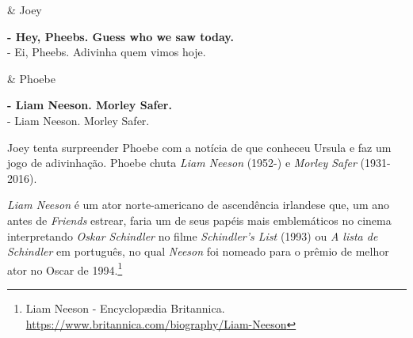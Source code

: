 \begin{tcolorbox}[enhanced,center upper,
    drop fuzzy shadow southeast, boxrule=0.3pt,
    lower separated=false, breakable,
    colframe=black!30!dialogoBorder,colback=white]
\begin{minipage}[c]{0.16\linewidth}
   & \centering \scriptsize{Joey}
\end{minipage}
\hfill
\begin{minipage}[c]{0.8\linewidth}
  \textbf{- Hey, Pheebs. Guess who we saw today.}\\
  - Ei, Pheebs. Adivinha quem vimos hoje.
\end{minipage}

\medskip
\begin{minipage}[c]{0.16\linewidth}
   & \centering \scriptsize{Phoebe}
\end{minipage}
\hfill
\begin{minipage}[c]{0.8\linewidth}
  \textbf{- Liam Neeson. Morley Safer.}\\
  - Liam Neeson. Morley Safer.
\end{minipage}
\end{tcolorbox}

Joey tenta surpreender Phoebe com a notícia de que conheceu Ursula e faz
um jogo de adivinhação. Phoebe chuta \emph{Liam Neeson} (1952-) e
\emph{Morley Safer} (1931-2016).

\emph{Liam Neeson} é um ator norte-americano de ascendência irlandese
que, um ano antes de \emph{Friends} estrear, faria um de seus papéis
mais emblemáticos no cinema interpretando \emph{Oskar Schindler} no
filme \emph{Schindler's List} (1993) ou \emph{A lista de Schindler} em
português, no qual \emph{Neeson} foi nomeado para o prêmio de melhor
ator no Oscar de 1994.\footnote{\sloppy Liam Neeson - Encyclopædia Britannica. \url{https://www.britannica.com/biography/Liam-Neeson}}

